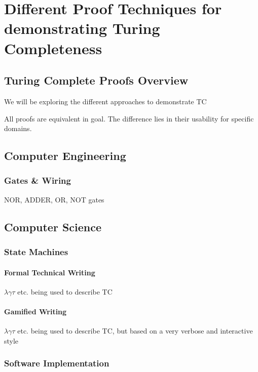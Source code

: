 \chapter{Different Proof Techniques for demonstrating Turing Completeness}

\section{Turing Complete Proofs Overview}

We will be exploring the different approaches to demonstrate TC

All proofs are equivalent in goal.
The difference lies in their usability for specific domains.

\section{Computer Engineering}

\subsection{Gates \& Wiring}

NOR, ADDER, OR, NOT gates

\section{Computer Science}

\subsection{State Machines}

\subsubsection{Formal Technical Writing}

$\lambda \gamma \tau $ etc. being used to describe TC

\subsubsection{Gamified Writing}

$\lambda \gamma \tau $ etc. being used to describe TC, but based on a very verbose and interactive style

\subsection{Software Implementation}


